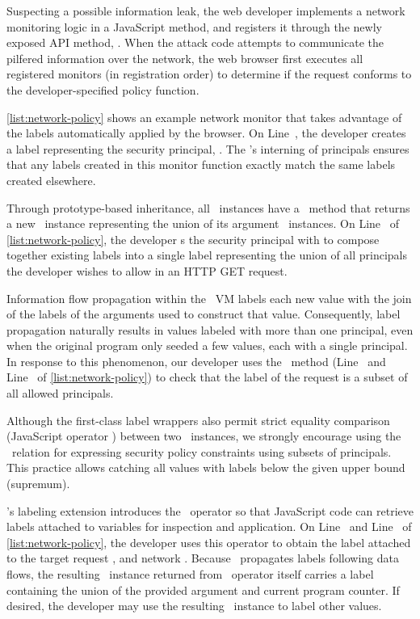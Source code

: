 Suspecting a possible information leak, the web developer implements a network monitoring logic in a JavaScript method, and registers it through the newly exposed API method, .
When the attack code attempts to communicate the pilfered information over the network, the web browser first executes all registered monitors (in registration order) to determine if the request conforms to the developer-specified policy function.

\autoref{list:network-policy} shows an example network monitor that takes advantage of the labels automatically applied by the browser.
On Line~, the developer creates a label representing the security principal, .
The \FlowLabelRegistry's interning of principals ensures that any labels created in this monitor function exactly match the same labels created elsewhere.

Through prototype-based inheritance, all \FlowLabelObject\ instances have a \mjoin\ method that returns a new \FlowLabelObject\ instance representing the union of its argument \FlowLabelObject\ instances.
On Line~ of \autoref{list:network-policy}, the developer \mjoin s the security principal  with  to compose together existing labels into a single label representing the union of all principals the developer wishes to allow in an HTTP GET request.

Information flow propagation within the \JitFlow\ VM labels each new value with the join of the labels of the arguments used to construct that value.
Consequently, label propagation naturally results in values labeled with more than one principal, even when the original program only seeded a few values, each with a single principal.
In response to this phenomenon, our developer uses the \msubsumes\ method (Line~ and Line~ of \autoref{list:network-policy}) to check that the label of the request is a subset of all allowed principals.

Although the first-class label wrappers also permit strict equality comparison (JavaScript operator \code{===}) between two \FlowLabelObject\ instances, we strongly encourage using the \msubsumes\ relation for expressing security policy constraints using subsets of principals.
This practice allows catching all values with labels below the given upper bound (supremum).

\JitFlow's labeling extension introduces the \mlabelof\ operator so that JavaScript code can retrieve labels attached to variables for inspection and application.
On Line~ and Line~ of \autoref{list:network-policy}, the developer uses this operator to obtain the label attached to the target request , and network .
Because \JitFlow\ propagates labels following data flows, the resulting \FlowLabelObject\ instance returned from \mlabelof\ operator itself carries a label containing the union of the provided argument and current program counter.
If desired, the developer may use the resulting \FlowLabelObject\ instance to label other values.


